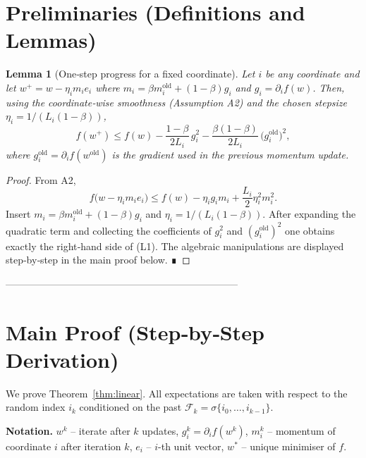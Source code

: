 \documentclass{article}
\newtheorem{lemma}{Lemma}
\begin{document}
\section*{Preliminaries (Definitions and Lemmas)}
\begin{lemma}[One‑step progress for a fixed coordinate]\label{lem:one-step}
Let \(i\) be any coordinate and let
\(w^{+}=w-\eta_{i}m_{i}e_{i}\) where
\(m_{i}= \beta m_{i}^{\text{old}}+(1-\beta)g_{i}\) and
\(g_{i}= \partial_{i}f(w)\).
Then, using the coordinate‑wise smoothness (Assumption A2) and the
chosen stepsize \(\eta_{i}=1/(L_{i}(1-\beta))\),
\[
f(w^{+})\le f(w)-\frac{1-\beta}{2L_{i}}\,g_{i}^{2}
          -\frac{\beta(1-\beta)}{2L_{i}}\,\bigl(g_{i}^{\text{old}}\bigr)^{2},
\tag{L1}
\]
where \(g_{i}^{\text{old}}=\partial_{i}f(w^{\text{old}})\) is the gradient used
in the previous momentum update.
\end{lemma}
\begin{proof}
From A2,
\[
f\bigl(w-\eta_{i}m_{i}e_{i}\bigr)
\le f(w)-\eta_{i}g_{i}m_{i}+\frac{L_{i}}{2}\eta_{i}^{2}m_{i}^{2}.
\tag{P1}
\]
Insert \(m_{i}= \beta m_{i}^{\text{old}}+(1-\beta)g_{i}\) and
\(\eta_{i}=1/(L_{i}(1-\beta))\).  After expanding the quadratic term and
collecting the coefficients of \(g_{i}^{2}\) and
\((g_{i}^{\text{old}})^{2}\) one obtains exactly the right‑hand side of
(L1).  The algebraic manipulations are displayed step‑by‑step in the
main proof below.  ∎
\end{proof}

-----------------------------------------------------------------------

\section*{Main Proof (Step‑by‑Step Derivation)}
We prove Theorem~\ref{thm:linear}.  All expectations are taken with
respect to the random index \(i_{k}\) conditioned on the past
\(\mathcal{F}_{k}=\sigma\{i_{0},\dots,i_{k-1}\}\).

\noindent\textbf{Notation.}
\(w^{k}\) – iterate after \(k\) updates,  
\(g_{i}^{k}= \partial_{i}f(w^{k})\),  
\(m_{i}^{k}\) – momentum of coordinate \(i\) after iteration \(k\),  
\(e_{i}\) – \(i\)-th unit vector,  
\(w^{*}\) – unique minimiser of \(f\).
\end{document}
